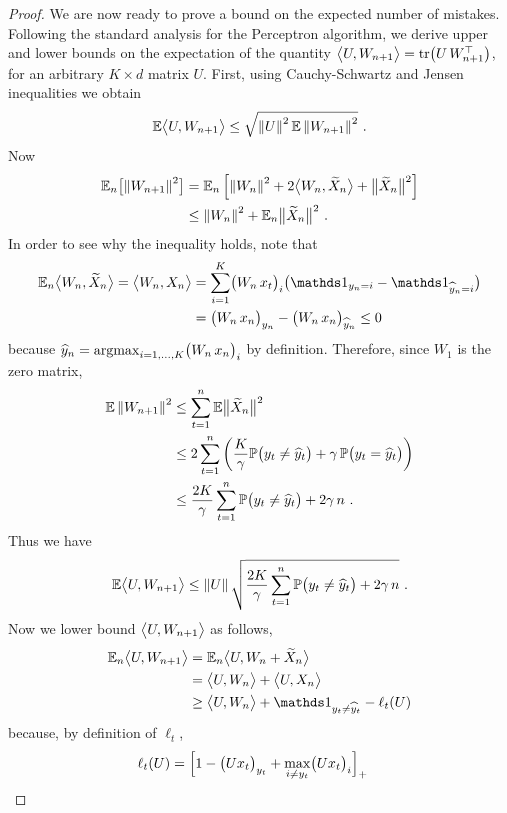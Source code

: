\begin{proof}
We are now ready to prove a bound on the expected number of mistakes. Following the standard analysis for the Perceptron algorithm, we derive upper and lower bounds on the expectation of the quantity $\bigl\langle{U},{W_{n+1}}\bigr\rangle = \mathrm{tr}\bigl(U\,W_{n+1}^{\top}\bigr)$, for an arbitrary $K \times d$ matrix $U$.
First, using Cauchy-Schwartz and Jensen inequalities we obtain
\begin{align*}
    \mathbb{E}\bigl\langle{U},{W_{n+1}}\bigr\rangle
\le
    \sqrt{\left\|{U}\right\|^2\mathbb{E}\left\|{W_{n+1}}\right\|^2}~.
\end{align*}
Now
\begin{align*}
    \mathbb{E}_n\bigl[\left\|{W_{n+1}}\right\|^2\bigr]
&=
    \mathbb{E}_n\left[\left\|{W_n}\right\|^2 + 2\bigl\langle{W_n},{\widetilde{X}_n}\bigr\rangle + \bigl\|\widetilde{X}_n\bigr\|^2\right]
\\ &\le
    \left\|{W_n}\right\|^2 + \mathbb{E}_n\bigl\|\widetilde{X}_n\bigr\|^2~.
\end{align*}
In order to see why the inequality holds, note that
\begin{align*}
    \E_n\inner{W_n}{\tX_n}
=
    \inner{W_n}{X_n}
&=
    \sum_{i=1}^K \bigl(W_n\,x_t\bigr)_i \bigl(\ds1_{y_n=i} - \ds1_{\yhat_n=i}\bigr)
\\ &=
    \bigl(W_n\,x_n\bigr)_{y_n} - \bigl(W_n\,x_n\bigr)_{\yhat_n} \le 0
\end{align*}
because $\widehat{y}_n = \mathop{\mathrm{argmax}}_{i=1,\dots,K} \bigl(W_n\,x_n\bigr)_i$ by definition.
Therefore, since $W_1$ is the zero matrix,
\begin{align*}
    \mathbb{E}\left\|{W_{n+1}}\right\|^2
&\le
    \sum_{t=1}^n \mathbb{E}\bigl\|\widetilde{X}_n\bigr\|^2
\\ &\le
    2\sum_{t=1}^n \left(\frac{K}{\gamma}\mathbb{P}\bigl(y_t \neq \widehat{y}_t\bigr) + \gamma\,\mathbb{P}\bigl(y_t = \widehat{y}_t\bigr)\right)
\\ &\le
\frac{2K}{\gamma}\sum_{t=1}^n \mathbb{P}\bigl(y_t \neq \widehat{y}_t\bigr) + 2\gamma\,n~.
\end{align*}
Thus we have
\[
    \mathbb{E}\bigl\langle{U},{W_{n+1}}\bigr\rangle \le \left\|{U}\right\|\sqrt{\frac{2K}{\gamma}\sum_{t=1}^n \mathbb{P}\bigl(y_t \neq \widehat{y}_t\bigr) + 2\gamma\,n}~.
\]
Now we lower bound $\bigl\langle{U},{W_{n+1}}\bigr\rangle$ as follows,
\begin{align*}
    \E_n\inner{U}{W_{n+1}}
&=
    \E_n\inner{U}{W_n + \tX_n}
\\ &=
    \inner{U}{W_n} + \inner{U}{X_n}
\\ &\ge
    \inner{U}{W_n} + \ds1_{y_t \neq \yhat_t} - \ell_t(U)
\end{align*}
because, by definition of $\ell_t$,
\begin{align*}
    \ell_t(U)
&=
    \Bigl[1 - \bigl(Ux_t\bigr)_{y_t} + \max_{i \neq y_t}\bigl(Ux_t\bigr)_i \Bigr]_+

\end{align*}
\end{proof}
